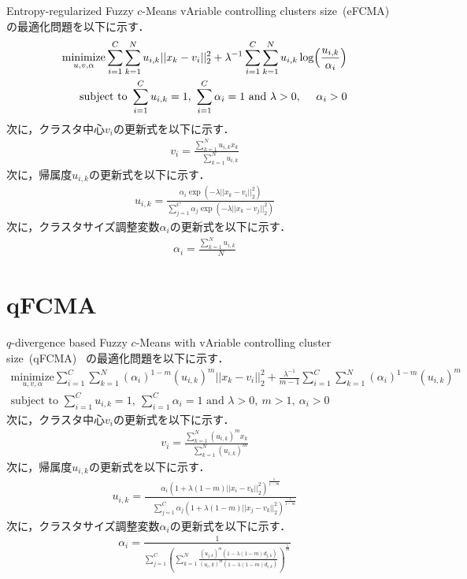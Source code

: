 \documentclass[a4j,12pt,dvipdfmx,oneside]{jsbook}
\theoremstyle{definition}
\begin{document}
 Entropy-regularized Fuzzy $c$-Means vAriable controlling clusters size~(eFCMA)~\cite{eFCMA}
 の最適化問題を以下に示す．
 \begin{align}
  \underset{u,v,\alpha}{\text{minimize}}
  \sum_{i=1}^C\sum_{k=1}^Nu_{i,k}||x_k-v_i||_2^2+\lambda^{-1}\sum_{i=1}^C\sum_{k=1}^Nu_{i,k}\log\Bigl(\frac{u_{i,k}}{\alpha_{i}}\Bigl)\\
  {\text{subject to }}\sum_{i=1}^Cu_{i,k}=1,~\sum_{i=1}^C\alpha_{i}=1{\text{ and }}\lambda>0,~\quad\alpha_{i}>0
 \end{align}
 次に，クラスタ中心$v_{i}$の更新式を以下に示す．
 \begin{align}
  v_{i}=\frac{\sum_{k=1}^Nu_{i,k}x_{k}}{\quad\sum_{k=1}^Nu_{i,k}}
 \end{align}
 次に，帰属度$u_{i,k}$の更新式を以下に示す．
 \begin{align}
  u_{i,k}=\frac{\alpha_{i}\exp(-\lambda||x_k-v_i||_2^2)}{\sum_{j=1}^C\alpha_{j}\exp(-\lambda||x_k-v_j||_2^2)}
 \end{align}
 次に，クラスタサイズ調整変数$\alpha_{i}$の更新式を以下に示す．
 \begin{align}
  \alpha_{i}=\frac{\sum_{k=1}^Nu_{i,k}}{\quad N}
 \end{align}

 \section{qFCMA}\label{sec:qfcma}
 
 $q$-divergence based Fuzzy $c$-Means with vAriable controlling cluster size~(qFCMA)~\cite{qFCMA}
 の最適化問題を以下に示す．
 \begin{align}
  \underset{u,v,\alpha}{\text{minimize}}
  \sum_{i=1}^C\sum_{k=1}^N(\alpha_{i})^{1-m}(u_{i,k})^m||x_k-v_i||_2^2
  +\frac{\lambda^{-1}}{m-1}\sum_{i=1}^C\sum_{k=1}^N(\alpha_{i})^{1-m}(u_{i,k})^m\\
  {\text{subject to }}\sum_{i=1}^Cu_{i,k}=1,~\sum_{i=1}^C\alpha_{i}=1{\text{ and }}\lambda>0,~m>1,~\alpha_{i}>0
 \end{align}
 次に，クラスタ中心$v_{i}$の更新式を以下に示す．
 \begin{align}
  v_{i}=\frac{\sum_{k=1}^N(u_{i,k})^mx_{k}}{\quad\sum_{k=1}^N(u_{i,k})^{m}}
 \end{align}
 次に，帰属度$u_{i,k}$の更新式を以下に示す．
 \begin{align}
  u_{i,k}=\frac{\alpha_{i}(1+\lambda(1-m)||x_i-v_k||_2^2)^\frac{1}{1-m}}{\quad\sum_{j=1}^C\alpha_{j}(1+\lambda(1-m)||x_j-v_k||_2^2)^\frac{1}{1-m}}
 \end{align}
 次に，クラスタサイズ調整変数$\alpha_{i}$の更新式を以下に示す．
 \begin{align}
  \alpha_{i}=\frac{1}{\sum_{j=1}^C\left(\sum_{k=1}^N\frac{(u_{j,k})^m(1-\lambda(1-m)d_{j,k})}{(u_i,k)^m(1-\lambda(1-m)d_{i,k})}\right)^{\frac{1}{m}}}
 \end{align}
\end{document}
